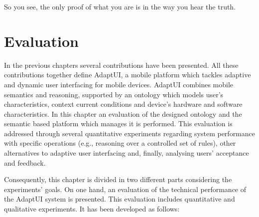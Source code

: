 \begin{savequote}[50mm]
So you see, the only proof of what you are is in the way you hear the truth.
\end{savequote}

\ifpdf
\graphicspath{{5_experiments_and_results/figures/PNG/}
{5_experiments_and_results/figures/PDF/}{5_experiments_and_results/figures/}}
\fi

\chapter{Evaluation}
\label{cha:evaluation}


In the previous chapters several contributions have been presented. All these
contributions together define AdaptUI, a mobile platform which tackles adaptive 
and dynamic user interfacing for mobile devices. AdaptUI combines mobile 
semantics and reasoning, supported by an ontology which models user's 
characteristics, context current conditions and device's hardware and software 
characteristics. In this chapter an evaluation of the designed ontology and the 
semantic based platform which manages it is performed. This evaluation is 
addressed through several quantitative experiments regarding system performance 
with specific operations (e.g., reasoning over a controlled set of rules), other 
alternatives to adaptive user interfacing and, finally, analysing users' 
acceptance and feedback.

Consequently, this chapter is divided in two different parts considering the 
experiments' goals. On one hand, an evaluation of the technical performance
of the AdaptUI system is presented. This evaluation includes quantitative and 
qualitative experiments. It has been developed as follows:

